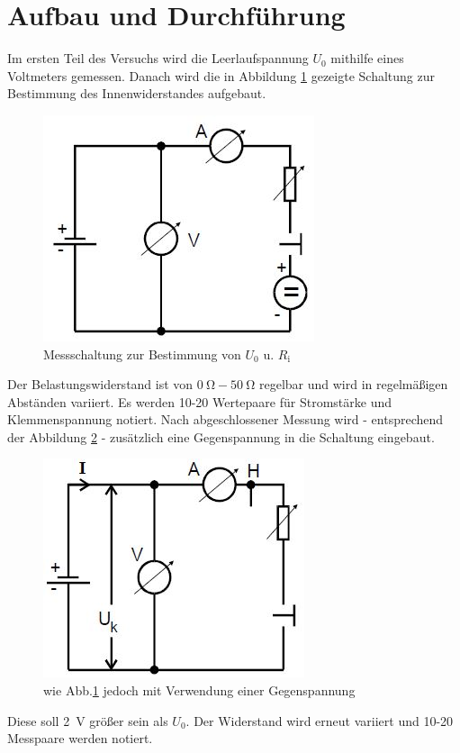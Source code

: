 \section{Aufbau und Durchführung}

Im ersten Teil des Versuchs wird die Leerlaufspannung $U_\text{0}$ mithilfe eines Voltmeters gemessen.
Danach wird die in Abbildung \ref{fig:A1} gezeigte Schaltung zur Bestimmung des Innenwiderstandes aufgebaut.
\begin{figure}
  \centering
  \includegraphics{Text/Bilder/A1.jpg}
  \caption{Messschaltung zur Bestimmung von $U_\text{0}$ u. $R_\text{i}$ \cite[215]{sample}}
  \label{fig:A1}
\end{figure}
Der Belastungswiderstand ist von $\SI{0}{\ohm} - \SI{50}{\ohm}$ regelbar und
wird in regelmäßigen Abständen variiert.
Es werden 10-20 Wertepaare für Stromstärke und Klemmenspannung notiert.
Nach abgeschlossener Messung wird - entsprechend der Abbildung \ref{fig:A2} - zusätzlich eine Gegenspannung
in die Schaltung eingebaut.
\begin{figure}
  \centering
  \includegraphics{text/Bilder/A2.jpg}
  \caption{wie Abb.\ref{fig:A1} jedoch mit Verwendung einer Gegenspannung \cite[215]{sample}}
  \label{fig:A2}
\end{figure}
Diese soll \SI{2}{V} größer sein als $U_0$. Der Widerstand wird erneut variiert und 10-20 Messpaare werden notiert.

